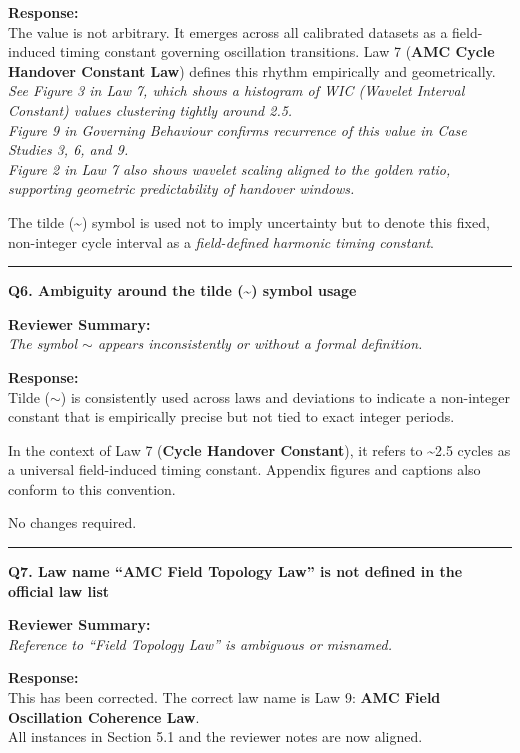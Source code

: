 \documentclass[10pt,aps,pre,onecolumn,superscriptaddress,notitlepage]{revtex4-2}
\begin{document}
\textbf{Response:} \\
The value is not arbitrary. It emerges across all calibrated datasets as a field-induced timing constant governing oscillation transitions. Law 7 (\textbf{AMC Cycle Handover Constant Law}) defines this rhythm empirically and geometrically. \\
\textit{See Figure 3 in Law 7, which shows a histogram of WIC (Wavelet Interval Constant) values clustering tightly around 2.5.} \\
\textit{Figure 9 in Governing Behaviour confirms recurrence of this value in Case Studies 3, 6, and 9.} \\
\textit{Figure 2 in Law 7 also shows wavelet scaling aligned to the golden ratio, supporting geometric predictability of handover windows.}

The tilde (\textasciitilde) symbol is used not to imply uncertainty but to denote this fixed, non-integer cycle interval as a \textit{field-defined harmonic timing constant}.

\vspace{1em}
\hrule
\vspace{1em}

\textbf{Q6. Ambiguity around the tilde (\textasciitilde) symbol usage}

\textbf{Reviewer Summary:} \\
\textit{The symbol $\sim$ appears inconsistently or without a formal definition.}

\textbf{Response:} \\
Tilde ($\sim$) is consistently used across laws and deviations to indicate a non-integer constant that is empirically precise but not tied to exact integer periods.

In the context of Law 7 (\textbf{Cycle Handover Constant}), it refers to \textasciitilde2.5 cycles as a universal field-induced timing constant. Appendix figures and captions also conform to this convention.

No changes required.

\vspace{1em}
\hrule
\vspace{1em}

\textbf{Q7. Law name “AMC Field Topology Law” is not defined in the official law list}

\textbf{Reviewer Summary:} \\
\textit{Reference to “Field Topology Law” is ambiguous or misnamed.}

\textbf{Response:} \\
This has been corrected. The correct law name is Law 9: \textbf{AMC Field Oscillation Coherence Law}. \\
All instances in Section 5.1 and the reviewer notes are now aligned.
\end{document}
